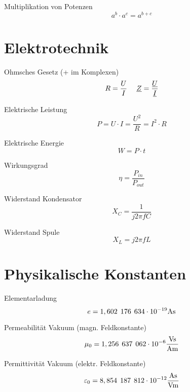 \documentclass[11pt,a4paper,draft, fleqn, twocolumn]{article}
\numberwithin{equation}{section}
\begin{document}
\noindent Multiplikation von Potenzen
\begin{equation}
    a^b \cdot a^c = a^{b+c}
\end{equation}

\section{Elektrotechnik}

Ohmsches Gesetz (+ im Komplexen)
\begin{equation}
    R = \frac{U}{I} \hspace{3ex}
    \underline{Z} = \frac{\underline{U}}{\underline{I}}
\end{equation}

\noindent Elektrische Leistung
\begin{equation}
    P = U \cdot I = \frac{U^2}{R} = I^2 \cdot R
\end{equation}

\noindent Elektrische Energie
\begin{equation}
    W = P \cdot t
\end{equation}

\noindent Wirkungsgrad
\begin{equation}
    \eta = \frac{P_{in}}{P_{out}}
\end{equation}

\noindent Widerstand Kondensator
\begin{equation}
    X_C = \frac{1}{j 2\pi f C}
\end{equation}

\noindent Widerstand Spule
\begin{equation}
    X_L = j 2\pi f L
\end{equation}

\pagebreak
\section{Physikalische Konstanten}

Elementarladung
\begin{equation}
    e = 1,602 \hspace{1ex} 176 \hspace{1ex} 634 \cdot 10^{-19} \text{As}
\end{equation}

\noindent Permeabilität Vakuum (magn. Feldkonstante)
\begin{equation}
    \mu_0 = 1,256 \hspace{1ex} 637 \hspace{1ex} 062 \cdot 10^{-6} \frac{\text{Vs}}{\text{Am}}
\end{equation}

\noindent Permittivität Vakuum (elektr. Feldkonstante)
\begin{equation}
    \varepsilon_0 = 8,854 \hspace{1ex} 187 \hspace{1ex} 812 \cdot 10^{-12} \frac{\text{As}}{\text{Vm}}
\end{equation}
    
\end{document}
